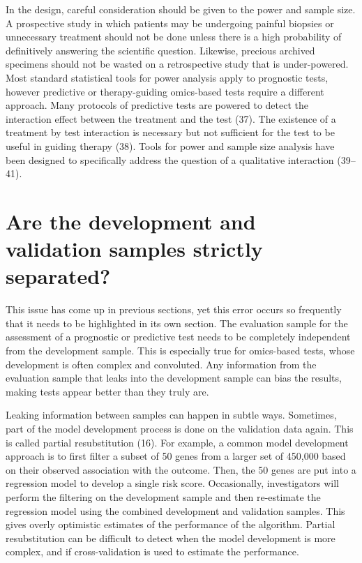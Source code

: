 \documentclass[11pt]{article}
\begin{document}
In the design, careful consideration should be given to the power and
sample size. A prospective study in which patients may be undergoing
painful biopsies or unnecessary treatment should not be done unless
there is a high probability of definitively answering the scientific
question. Likewise, precious archived specimens should not be wasted on
a retrospective study that is under-powered. Most standard statistical
tools for power analysis apply to prognostic tests, however predictive
or therapy-guiding omics-based tests require a different approach. Many
protocols of predictive tests are powered to detect the interaction
effect between the treatment and the test (37). The existence of a
treatment by test interaction is necessary but not sufficient for the
test to be useful in guiding therapy (38). Tools for power and sample
size analysis have been designed to specifically address the question of
a qualitative interaction (39--41).

\section{Are the development and validation samples strictly
separated?}\label{are-the-development-and-validation-samples-strictly-separated}

This issue has come up in previous sections, yet this error occurs so
frequently that it needs to be highlighted in its own section. The
evaluation sample for the assessment of a prognostic or predictive test
needs to be completely independent from the development sample. This is
especially true for omics-based tests, whose development is often
complex and convoluted. Any information from the evaluation sample that
leaks into the development sample can bias the results, making tests
appear better than they truly are.

Leaking information between samples can happen in subtle ways.
Sometimes, part of the model development process is done on the
validation data again. This is called partial resubstitution (16). For
example, a common model development approach is to first filter a subset
of 50 genes from a larger set of 450,000 based on their observed
association with the outcome. Then, the 50 genes are put into a
regression model to develop a single risk score. Occasionally,
investigators will perform the filtering on the development sample and
then re-estimate the regression model using the combined development and
validation samples. This gives overly optimistic estimates of the
performance of the algorithm. Partial resubstitution can be difficult to
detect when the model development is more complex, and if
cross-validation is used to estimate the performance.
\end{document}
